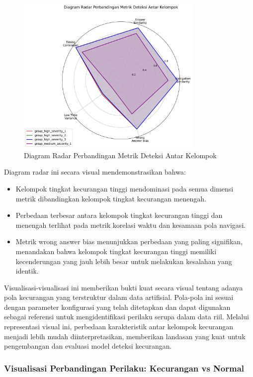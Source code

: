 \begin{figure}[htbp]
    \centering
    \includegraphics[width=0.8\textwidth]{figures/radar_chart_comparison.pdf}
    \caption{Diagram Radar Perbandingan Metrik Deteksi Antar Kelompok}
    \label{fig:radar_chart_comparison}
\end{figure}

Diagram radar ini secara visual mendemonstrasikan bahwa:
\begin{itemize}
    \item Kelompok tingkat kecurangan tinggi mendominasi pada semua dimensi metrik dibandingkan kelompok tingkat kecurangan menengah.
    \item Perbedaan terbesar antara kelompok tingkat kecurangan tinggi dan menengah terlihat pada metrik korelasi waktu dan kesamaan pola navigasi.
    \item Metrik wrong answer bias menunjukkan perbedaan yang paling signifikan, menandakan bahwa kelompok tingkat kecurangan tinggi memiliki kecenderungan yang jauh lebih besar untuk melakukan kesalahan yang identik.
\end{itemize}

Visualisasi-visualisasi ini memberikan bukti kuat secara visual tentang adanya pola kecurangan yang terstruktur dalam data artifisial. Pola-pola ini sesuai dengan parameter konfigurasi yang telah ditetapkan dan dapat digunakan sebagai referensi untuk mengidentifikasi perilaku serupa dalam data riil. Melalui representasi visual ini, perbedaan karakteristik antar kelompok kecurangan menjadi lebih mudah diinterpretasikan, memberikan landasan yang kuat untuk pengembangan dan evaluasi model deteksi kecurangan.

\subsubsection{Visualisasi Perbandingan Perilaku: Kecurangan vs Normal}

